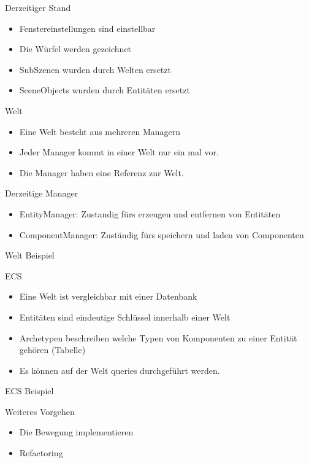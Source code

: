 \documentclass{../presentation}
\begin{document}
\frame[plain]{\titlepage}

\begin{frame}{Derzeitiger Stand}
    \begin{itemize}
        \item Fenstereinstellungen sind einstellbar
        \item Die Würfel werden gezeichnet
        \item SubSzenen wurden durch Welten ersetzt
        \item SceneObjects wurden durch Entitäten ersetzt
    \end{itemize}
\end{frame}

\begin{frame}{Welt}
    \begin{itemize}
        \item Eine Welt besteht aus mehreren Managern
        \item Jeder Manager kommt in einer Welt nur ein mal vor.
        \item Die Manager haben eine Referenz zur Welt.
    \end{itemize}
\end{frame}

\begin{frame}{Derzeitige Manager}
    \begin{itemize}
        \item EntityManager: Zustandig fürs erzeugen und entfernen von Entitäten
        \item ComponentManager: Zuständig fürs speichern und laden von Componenten
    \end{itemize}
\end{frame}

\begin{frame}{Welt Beispiel}
    
\end{frame}

\begin{frame}{ECS}
    \begin{itemize}
        \item Eine Welt ist vergleichbar mit einer Datenbank
        \item Entitäten sind eindeutige Schlüssel innerhalb einer Welt
        \item Archetypen beschreiben welche Typen von Komponenten zu einer Entität gehören (Tabelle)
        \item Es können auf der Welt queries durchgeführt werden.
    \end{itemize}
\end{frame}

\begin{frame}{ECS Beispiel}
    
\end{frame}

\begin{frame}{Weiteres Vorgehen}
    \begin{itemize}
        \item Die Bewegung implementieren
        \item Refactoring
    \end{itemize}
\end{frame}
\end{document}
